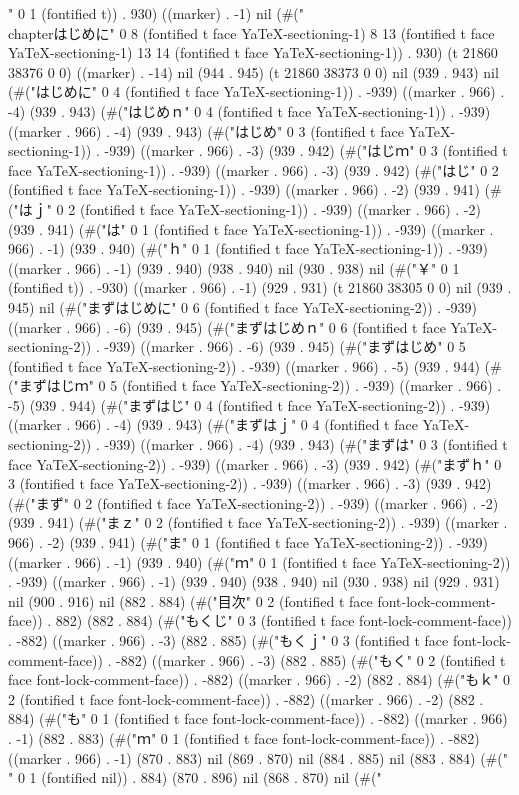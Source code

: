 " 0 1 (fontified t)) . 930) ((marker) . -1) nil (#("\\chapter{はじめに}" 0 8 (fontified t face YaTeX-sectioning-1) 8 13 (fontified t face YaTeX-sectioning-1) 13 14 (fontified t face YaTeX-sectioning-1)) . 930) (t 21860 38376 0 0) ((marker) . -14) nil (944 . 945) (t 21860 38373 0 0) nil (939 . 943) nil (#("はじめに" 0 4 (fontified t face YaTeX-sectioning-1)) . -939) ((marker . 966) . -4) (939 . 943) (#("はじめｎ" 0 4 (fontified t face YaTeX-sectioning-1)) . -939) ((marker . 966) . -4) (939 . 943) (#("はじめ" 0 3 (fontified t face YaTeX-sectioning-1)) . -939) ((marker . 966) . -3) (939 . 942) (#("はじｍ" 0 3 (fontified t face YaTeX-sectioning-1)) . -939) ((marker . 966) . -3) (939 . 942) (#("はじ" 0 2 (fontified t face YaTeX-sectioning-1)) . -939) ((marker . 966) . -2) (939 . 941) (#("はｊ" 0 2 (fontified t face YaTeX-sectioning-1)) . -939) ((marker . 966) . -2) (939 . 941) (#("は" 0 1 (fontified t face YaTeX-sectioning-1)) . -939) ((marker . 966) . -1) (939 . 940) (#("ｈ" 0 1 (fontified t face YaTeX-sectioning-1)) . -939) ((marker . 966) . -1) (939 . 940) (938 . 940) nil (930 . 938) nil (#("￥" 0 1 (fontified t)) . -930) ((marker . 966) . -1) (929 . 931) (t 21860 38305 0 0) nil (939 . 945) nil (#("まずはじめに" 0 6 (fontified t face YaTeX-sectioning-2)) . -939) ((marker . 966) . -6) (939 . 945) (#("まずはじめｎ" 0 6 (fontified t face YaTeX-sectioning-2)) . -939) ((marker . 966) . -6) (939 . 945) (#("まずはじめ" 0 5 (fontified t face YaTeX-sectioning-2)) . -939) ((marker . 966) . -5) (939 . 944) (#("まずはじｍ" 0 5 (fontified t face YaTeX-sectioning-2)) . -939) ((marker . 966) . -5) (939 . 944) (#("まずはじ" 0 4 (fontified t face YaTeX-sectioning-2)) . -939) ((marker . 966) . -4) (939 . 943) (#("まずはｊ" 0 4 (fontified t face YaTeX-sectioning-2)) . -939) ((marker . 966) . -4) (939 . 943) (#("まずは" 0 3 (fontified t face YaTeX-sectioning-2)) . -939) ((marker . 966) . -3) (939 . 942) (#("まずｈ" 0 3 (fontified t face YaTeX-sectioning-2)) . -939) ((marker . 966) . -3) (939 . 942) (#("まず" 0 2 (fontified t face YaTeX-sectioning-2)) . -939) ((marker . 966) . -2) (939 . 941) (#("まｚ" 0 2 (fontified t face YaTeX-sectioning-2)) . -939) ((marker . 966) . -2) (939 . 941) (#("ま" 0 1 (fontified t face YaTeX-sectioning-2)) . -939) ((marker . 966) . -1) (939 . 940) (#("ｍ" 0 1 (fontified t face YaTeX-sectioning-2)) . -939) ((marker . 966) . -1) (939 . 940) (938 . 940) nil (930 . 938) nil (929 . 931) nil (900 . 916) nil (882 . 884) (#("目次" 0 2 (fontified t face font-lock-comment-face)) . 882) (882 . 884) (#("もくじ" 0 3 (fontified t face font-lock-comment-face)) . -882) ((marker . 966) . -3) (882 . 885) (#("もくｊ" 0 3 (fontified t face font-lock-comment-face)) . -882) ((marker . 966) . -3) (882 . 885) (#("もく" 0 2 (fontified t face font-lock-comment-face)) . -882) ((marker . 966) . -2) (882 . 884) (#("もｋ" 0 2 (fontified t face font-lock-comment-face)) . -882) ((marker . 966) . -2) (882 . 884) (#("も" 0 1 (fontified t face font-lock-comment-face)) . -882) ((marker . 966) . -1) (882 . 883) (#("ｍ" 0 1 (fontified t face font-lock-comment-face)) . -882) ((marker . 966) . -1) (870 . 883) nil (869 . 870) nil (884 . 885) nil (883 . 884) (#(" " 0 1 (fontified nil)) . 884) (870 . 896) nil (868 . 870) nil (#("
